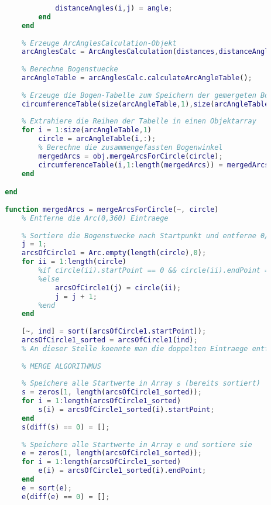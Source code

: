 \begin{lstlisting}[language=MATLAB, caption=Verfeinerung der lokalen Minima, label=lst:CircumferenceCalculation]
                    % Speichere den berechneten Wert in die Distanzwinkel-Matrix
                    distanceAngles(i,j) = angle;
                end
            end
            
            % Erzeuge ArcAnglesCalculation-Objekt
            arcAnglesCalc = ArcAnglesCalculation(distances,distanceAngles,obj.radius);
            
            % Berechne Bogenstuecke
            arcAngleTable = arcAnglesCalc.calculateArcAngleTable();
            
            % Erzeuge die Bogen-Tabelle zum Speichern der gemergeten Boegen
            circumferenceTable(size(arcAngleTable,1),size(arcAngleTable,2)) = Arc;
            
            % Extrahiere die Reihen der Tabelle in einen Objektarray
            for i = 1:size(arcAngleTable,1)
                circle = arcAngleTable(i,:);
                % Berechne die zusammengefassten Bogenwinkel
                mergedArcs = obj.mergeArcsForCircle(circle);
                circumferenceTable(i,1:length(mergedArcs)) = mergedArcs;
            end

        end
       
        function mergedArcs = mergeArcsForCircle(~, circle)     
            % Entferne die Arc(0,360) Eintraege
            
            % Sortiere die Bogenstuecke nach Startpunkt und entferne 0/360er
            j = 1;
            arcsOfCircle1 = Arc.empty(length(circle),0);
            for ii = 1:length(circle)
                %if circle(ii).startPoint == 0 && circle(ii).endPoint == 360
                %else
                    arcsOfCircle1(j) = circle(ii);
                    j = j + 1;
                %end
            end
            
            [~, ind] = sort([arcsOfCircle1.startPoint]);
            arcsOfCircle1_sorted = arcsOfCircle1(ind);
            % An dieser Stelle koennte man die doppelten Eintraege entfernen
            
            % MERGE ALGORITHMUS
            
            % Speichere alle Startwerte in Array s (bereits sortiert)
            s = zeros(1, length(arcsOfCircle1_sorted));
            for i = 1:length(arcsOfCircle1_sorted)
                s(i) = arcsOfCircle1_sorted(i).startPoint;
            end
            s(diff(s) == 0) = [];
            
            % Speichere alle Startwerte in Array e und sortiere sie
            e = zeros(1, length(arcsOfCircle1_sorted));
            for i = 1:length(arcsOfCircle1_sorted)
                e(i) = arcsOfCircle1_sorted(i).endPoint;
            end 
            e = sort(e);
            e(diff(e) == 0) = [];
            

\end{lstlisting}

